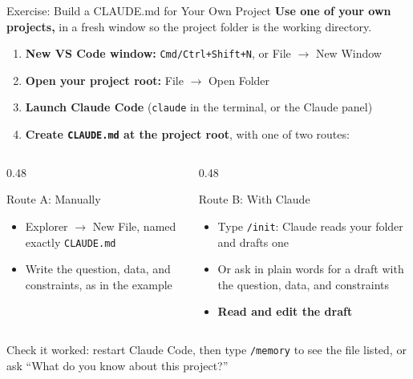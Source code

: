 \documentclass[aspectratio=169, 11pt]{beamer}
\begin{document}

\begin{frame}{Exercise: Build a CLAUDE.md for Your Own Project}
  \small
  \textbf{Use one of your own projects,} in a fresh window so the project folder is the working directory.

  \begin{enumerate}
    \item \textbf{New VS Code window:} \texttt{Cmd/Ctrl+Shift+N}, or File $\rightarrow$ New Window
    \item \textbf{Open your project root:} File $\rightarrow$ Open Folder
    \item \textbf{Launch Claude Code} (\texttt{claude} in the terminal, or the Claude panel)
    \item \textbf{Create \texttt{CLAUDE.md} at the project root}, with one of two routes:
  \end{enumerate}

  \vspace{0.2em}
  \begin{columns}[T]
    \begin{column}{0.48\textwidth}
      \begin{block}{Route A: Manually}
        \begin{itemize}\setlength{\itemsep}{0pt}
          \item Explorer $\rightarrow$ New File, named exactly \texttt{CLAUDE.md}
          \item Write the question, data, and constraints, as in the example
        \end{itemize}
      \end{block}
    \end{column}
    \begin{column}{0.48\textwidth}
      \begin{block}{Route B: With Claude}
        \begin{itemize}\setlength{\itemsep}{0pt}
          \item Type \texttt{/init}: Claude reads your folder and drafts one
          \item Or ask in plain words for a draft with the question, data, and constraints
          \item \textbf{Read and edit the draft}
        \end{itemize}
      \end{block}
    \end{column}
  \end{columns}

  \vspace{0.3em}
  \alert{Check it worked:} restart Claude Code, then type \texttt{/memory} to see the file listed, or ask ``What do you know about this project?''
\end{frame}
\end{document}
